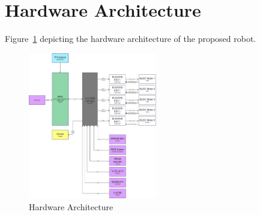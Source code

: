 \documentclass[a4paper,8pt]{article}
\begin{document}
\section{Hardware Architecture}

Figure~\ref{fig:hardware_architecture} depicting the hardware
architecture of the proposed robot.

\begin{figure}[H]
	\begin{center}
		\includegraphics[width=0.5\textwidth]{Hardware_architecture.png}
	\end{center}
	\caption{Hardware Architecture}
	\label{fig:hardware_architecture}
\end{figure}

 
\end{document}
